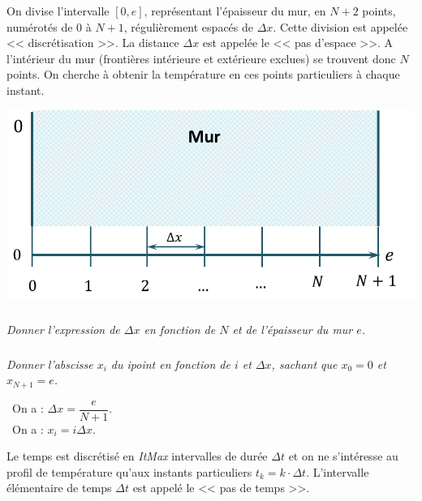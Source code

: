 \ifprof
\else

\noindent \begin{minipage}[c]{.6\linewidth}
On divise l'intervalle $[0,e]$, représentant l'épaisseur du mur, en $N+2$ points, numérotés de 0 à $N+1$, régulièrement 
espacés de $\Delta x$. Cette division est appelée << discrétisation >>. La distance $\Delta x$ est appelée le << pas 
d’espace >>. A l'intérieur du mur (frontières intérieure et extérieure exclues) se trouvent donc $N$ points. On cherche 
à obtenir la température en ces points particuliers à chaque instant. 


\end{minipage} \hfill
\begin{minipage}[c]{.38\linewidth}
\begin{center}
\includegraphics[width=\linewidth]{images/figure_02}
\end{center}
\end{minipage}

\subparagraph{\label{q_xini}}\textit{Donner l'expression de $\Delta x$ en fonction de $N$ et de l'épaisseur du mur $e$.}



\subparagraph{\label{q_xini2}}\textit{Donner l'abscisse $x_i$ du i\ieme point 
en fonction de $i$ et $\Delta x$, sachant que $x_0=0$ et  $x_{N+1} = e$.}

\fi

\ifprof
\begin{corrige}
\question\
On a : $\Delta x = \dfrac{e}{N+1}$.\\

\question\
On a : $x_i = i \Delta x$.
\end{corrige}
\else

\vspace{.5cm}

Le temps est discrétisé en \textit{ItMax} intervalles de durée $\Delta t$ et on ne s'intéresse 
au profil de température qu'aux instants particuliers $t_k = k \cdot \Delta t$. 
L'intervalle élémentaire de temps $\Delta t$ est appelé le << pas de temps >>.

